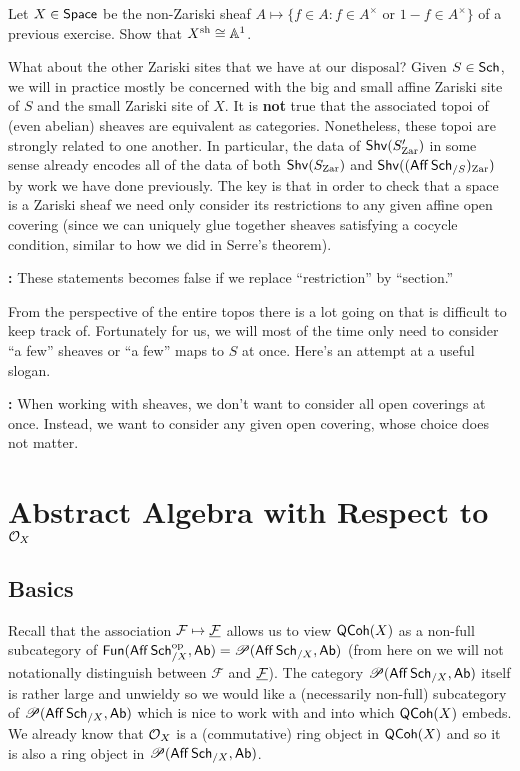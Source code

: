 \documentclass[11pt]{article}
\renewcommand{\F}{\mathcal{F}}
\begin{document}
\begin{exercise}
Let $X\in\operatorname{\mathsf{Space}}$ be the non-Zariski sheaf $A\mapsto\{f\in A : f\in A^{\times}\textrm{ or }1-f\in A^{\times}\}$ of a previous exercise. Show that $X^{\operatorname{sh}}\cong\mathbb{A}^1$.
\end{exercise}

What about the other Zariski sites that we have at our disposal? Given $S\in\operatorname{\mathsf{Sch}}$, we will in practice mostly be concerned with the big and small affine Zariski site of $S$ and the small Zariski site of $X$. It is \textbf{not} true that the associated topoi of (even abelian) sheaves are equivalent as categories. Nonetheless, these topoi are strongly related to one another. In particular, the data of $\operatorname{\mathsf{Shv}}(S'_{\operatorname{Zar}})$ in some sense already encodes all of the data of both $\operatorname{\mathsf{Shv}}(S_{\operatorname{Zar}})$ and $\operatorname{\mathsf{Shv}}((\operatorname{\mathsf{Aff}}\operatorname{\mathsf{Sch}}_{/S})_{\operatorname{Zar}})$ by work we have done previously. The key is that in order to check that a space is a Zariski sheaf we need only consider its restrictions to any given affine open covering (since we can uniquely glue together sheaves satisfying a cocycle condition, similar to how we did in Serre's theorem). 

\textbf{:} These statements becomes false if we replace ``restriction'' by ``section.''

From the perspective of the entire topos there is a lot going on that is difficult to keep track of. Fortunately for us, we will most of the time only need to consider ``a few'' sheaves or ``a few'' maps to $S$ at once. Here's an attempt at a useful slogan.

\textbf{:} When working with sheaves, we don't want to consider all open coverings at once. Instead, we want to consider any given open covering, whose choice does not matter.

\section{Abstract Algebra with Respect to $\mathcal{O}_X$}
\subsection{Basics}
Recall that the association $\F\mapsto\un{\F}$ allows us to view $\operatorname{\mathsf{QCoh}}(X)$ as a non-full subcategory of $\operatorname{\mathsf{Fun}}(\operatorname{\mathsf{Aff}}\operatorname{\mathsf{Sch}}_{/X}^{\operatorname{op}},\operatorname{\mathsf{Ab}})=\operatorname{\mathscr{P}}(\operatorname{\mathsf{Aff}}\operatorname{\mathsf{Sch}}_{/X},\operatorname{\mathsf{Ab}})$ (from here on we will not notationally distinguish between $\F$ and $\un{\F}$). The category $\operatorname{\mathscr{P}}(\operatorname{\mathsf{Aff}}\operatorname{\mathsf{Sch}}_{/X},\operatorname{\mathsf{Ab}})$ itself is rather large and unwieldy so we would like a (necessarily non-full) subcategory of $\operatorname{\mathscr{P}}(\operatorname{\mathsf{Aff}}\operatorname{\mathsf{Sch}}_{/X},\operatorname{\mathsf{Ab}})$ which is nice to work with and into which $\operatorname{\mathsf{QCoh}}(X)$ embeds. We already know that $\mathcal{O}_X$ is a (commutative) ring object in $\operatorname{\mathsf{QCoh}}(X)$ and so it is also a ring object in $\operatorname{\mathscr{P}}(\operatorname{\mathsf{Aff}}\operatorname{\mathsf{Sch}}_{/X},\operatorname{\mathsf{Ab}})$. 
\end{document}
